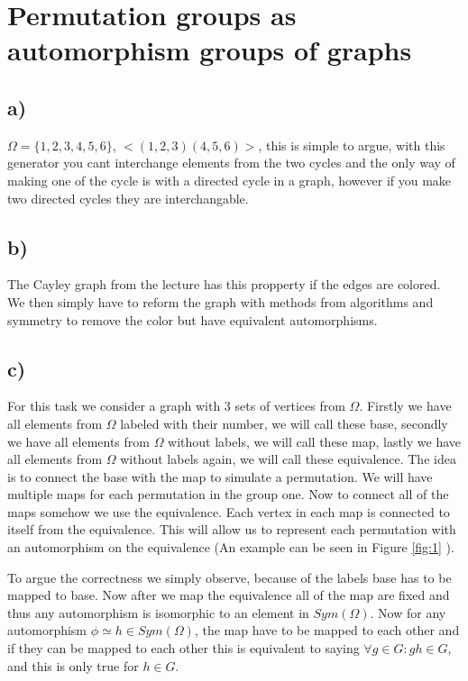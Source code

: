 \section{Permutation groups as automorphism groups of graphs}

\subsection*{a)}
$\Omega = \{1,2,3,4,5,6\}$, $<(1,2,3)(4,5,6)>$, this is simple to argue, with this generator you cant interchange elements from the two cycles and the only way of making one of the cycle is with a directed cycle in a graph, however if you make two directed cycles they are interchangable.

\subsection*{b)}
The Cayley graph from the lecture has this propperty if the edges are colored. We then simply have to reform the graph with methods from algorithms and symmetry to remove the color but have equivalent automorphisms.

\subsection*{c)}
For this task we consider a graph with 3 sets of vertices from $\Omega$. Firstly we have all elements from $\Omega$ labeled with their number, we will call these base, secondly we have all elements from $\Omega$ without labels, we will call these map, lastly we have all elements from $\Omega$ without labels again, we will call these equivalence. The idea is to connect the base with the map to simulate a permutation. We will have multiple maps for each permutation in the group one. Now to connect all of the maps somehow we use the equivalence. Each vertex in each map is connected to itself from the equivalence. This will allow us to represent each permutation with an automorphism on the equivalence (An example can be seen in Figure \ref{fig:1} ).

To argue the correctness we simply observe, because of the labels base has to be mapped to base. Now after we map the equivalence all of the map are fixed and thus any automorphism is isomorphic to an element in $Sym(\Omega)$. Now for any automorphism $\phi \simeq h\in Sym(\Omega)$, the map have to be mapped to each other and if they can be mapped to each other this is equivalent to saying $\forall g \in G: gh \in G$, and this is only true for $h \in G$.

